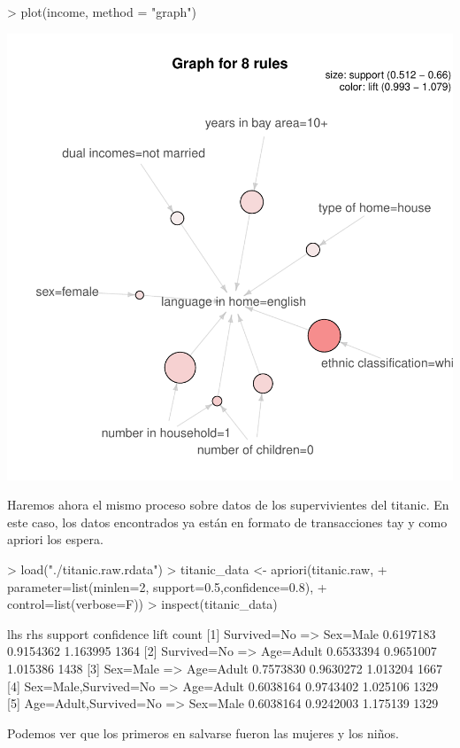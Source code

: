 \documentclass [a4paper] {article}
\begin{document}
\begin{center}
\begin{Schunk}
\begin{Sinput}
> plot(income, method = "graph")
\end{Sinput}
\end{Schunk}
\includegraphics{entrega-grafica_apriori_income_graph}
\end{center}

Haremos ahora el mismo proceso sobre datos de los supervivientes del titanic.
En este caso, los datos encontrados ya están en formato de transacciones tay y como apriori los espera.
\begin{Schunk}
\begin{Sinput}
> load("./titanic.raw.rdata")
> titanic_data <- apriori(titanic.raw, 
+       parameter=list(minlen=2, support=0.5,confidence=0.8), 
+       control=list(verbose=F))
> inspect(titanic_data)
\end{Sinput}
\begin{Soutput}
    lhs                        rhs         support   confidence lift     count
[1] {Survived=No}           => {Sex=Male}  0.6197183 0.9154362  1.163995 1364 
[2] {Survived=No}           => {Age=Adult} 0.6533394 0.9651007  1.015386 1438 
[3] {Sex=Male}              => {Age=Adult} 0.7573830 0.9630272  1.013204 1667 
[4] {Sex=Male,Survived=No}  => {Age=Adult} 0.6038164 0.9743402  1.025106 1329 
[5] {Age=Adult,Survived=No} => {Sex=Male}  0.6038164 0.9242003  1.175139 1329 
\end{Soutput}
\end{Schunk}
Podemos ver que los primeros en salvarse fueron las mujeres y los niños.
\end{document}
